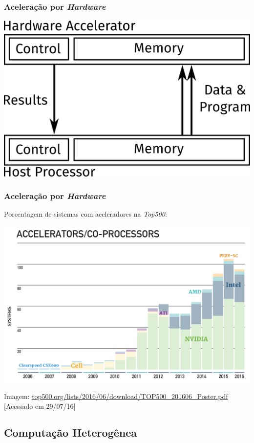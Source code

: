 \documentclass[10pt, compress]{beamer}
\begin{document}
\begin{frame}
    \frametitle{Aceleração por \textit{Hardware}}
    \centering
    \includegraphics[width=.8\textwidth]{accel}
\end{frame}

\begin{frame}
    \frametitle{Aceleração por \textit{Hardware}}
    Porcentagem de sistemas com aceleradores na \textit{Top500}:

    \begin{center}
    \includegraphics[width=.95\textwidth]{top500_accel}
    \hfill

        \tiny{Imagem: \url{top500.org/lists/2016/06/download/TOP500_201606_Poster.pdf} [Acessado em 29/07/16]}
    \end{center}
\end{frame}

\subsection{Computação Heterogênea}
\end{document}
